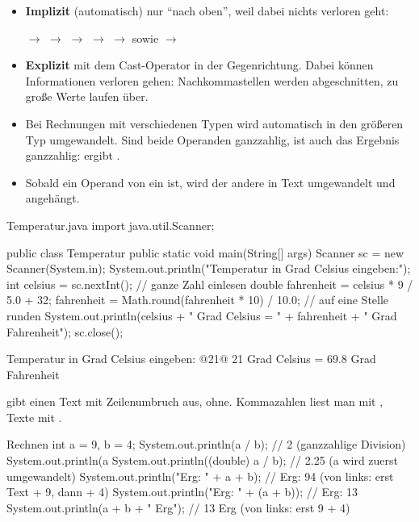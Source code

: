 \begin{merke}[Typumwandlung]
\begin{itemize}[itemsep=0.1em]
\item \textbf{Implizit} (automatisch) nur \enquote{nach oben}, weil dabei nichts verloren geht:
\begin{center}
 $\to$  $\to$  $\to$  $\to$  $\to$  \qquad sowie \qquad {} $\to$ 
\end{center}
\item \textbf{Explizit} mit dem Cast-Operator  in der Gegenrichtung. Dabei können Informationen verloren gehen: Nachkommastellen werden abgeschnitten, zu große Werte laufen über.
\item Bei Rechnungen mit verschiedenen Typen wird automatisch in den größeren Typ umgewandelt. Sind beide Operanden ganzzahlig, ist auch das Ergebnis ganzzahlig:  ergibt .
\item Sobald ein Operand von \code{+} ein  ist, wird der andere in Text umgewandelt und angehängt.
\end{itemize}
\end{merke}

\beispiele
{}
\begin{javacode}{Temperatur.java}
import java.util.Scanner;

public class Temperatur {
	public static void main(String[] args) {
		Scanner sc = new Scanner(System.in);
		System.out.println("Temperatur in Grad Celsius eingeben:");
		int celsius = sc.nextInt();                    // ganze Zahl einlesen
		double fahrenheit = celsius * 9 / 5.0 + 32;
		fahrenheit = Math.round(fahrenheit * 10) / 10.0;   // auf eine Stelle runden
		System.out.println(celsius + " Grad Celsius = " + fahrenheit + " Grad Fahrenheit");
		sc.close();
	}
}
\end{javacode}
\begin{konsole}
Temperatur in Grad Celsius eingeben:
@21@
21 Grad Celsius = 69.8 Grad Fahrenheit
\end{konsole}
 gibt einen Text mit Zeilenumbruch aus,  ohne. Kommazahlen liest man mit , Texte mit .

\begin{javacode}[Ausschnitt]{Rechnen}
int a = 9, b = 4;
System.out.println(a / b);              // 2      (ganzzahlige Division)
System.out.println(a %
System.out.println((double) a / b);     // 2.25   (a wird zuerst umgewandelt)
System.out.println("Erg: " + a + b);    // Erg: 94   (von links: erst Text + 9, dann + 4)
System.out.println("Erg: " + (a + b));  // Erg: 13
System.out.println(a + b + " Erg");     // 13 Erg    (von links: erst 9 + 4)
\end{javacode}

